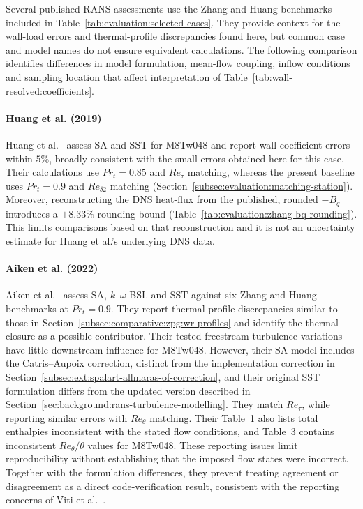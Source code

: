 Several published RANS assessments use the Zhang and Huang benchmarks included in Table~\ref{tab:evaluation:selected-cases}. They provide context for the wall-load errors and thermal-profile discrepancies found here, but common case and model names do not ensure equivalent calculations. The following comparison identifies differences in model formulation, mean-flow coupling, inflow conditions and sampling location that affect interpretation of Table~\ref{tab:wall-resolved:coefficients}.

\paragraph*{Huang et al. (2019)}

Huang et al.~\cite{huang2019assessment} assess SA and SST for M8Tw048 and report wall-coefficient errors within \(5\%\), broadly consistent with the small errors obtained here for this case. Their calculations use \(Pr_t=0.85\) and \(Re_\tau\) matching, whereas the present baseline uses \(Pr_t=0.9\) and \(Re_{\delta2}\) matching (Section~\ref{subsec:evaluation:matching-station}). Moreover, reconstructing the DNS heat-flux from the published, rounded \(-B_q\) introduces a \(\pm8.33\%\) rounding bound (Table~\ref{tab:evaluation:zhang-bq-rounding}). This limits comparisons based on that reconstruction and it is not an uncertainty estimate for Huang et al.'s underlying DNS data.

\paragraph*{Aiken et al. (2022)}

Aiken et al.~\cite{aiken2022assessment} assess SA, \(k\)--\(\omega\) BSL and SST against six Zhang and Huang benchmarks at \(Pr_t=0.9\). They report thermal-profile discrepancies similar to those in Section~\ref{subsec:comparative:zpg:wr-profiles} and identify the thermal closure as a possible contributor. Their tested freestream-turbulence variations have little downstream influence for M8Tw048. However, their SA model includes the Catris--Aupoix correction, distinct from the implementation correction in Section~\ref{subsec:ext:spalart-allmaras-of-correction}, and their original SST formulation differs from the updated version described in Section~\ref{sec:background:rans-turbulence-modelling}. They match \(Re_\tau\), while reporting similar errors with \(Re_\theta\) matching. Their Table~1 also lists total enthalpies inconsistent with the stated flow conditions, and Table~3 contains inconsistent \(Re_\theta/\theta\) values for M8Tw048. These reporting issues limit reproducibility without establishing that the imposed flow states were incorrect. Together with the formulation differences, they prevent treating agreement or disagreement as a direct code-verification result, consistent with the reporting concerns of Viti et al.~\cite{viti2007numerical}.

